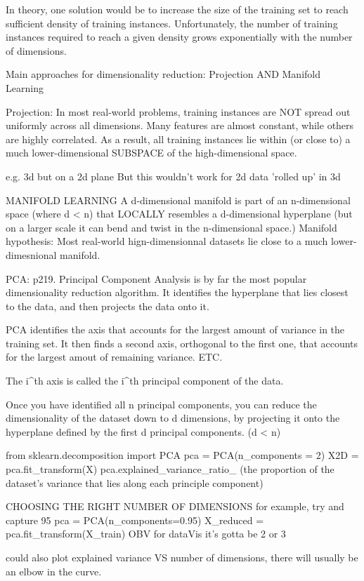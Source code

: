 In theory,
one solution would be to increase the size of the training set to reach sufficient density of training instances.
Unfortunately,
the number of training instances required to reach a given density grows exponentially with the number of dimensions.

Main approaches for dimensionality reduction:
Projection AND Manifold Learning

Projection:
In most real-world problems,
training instances are NOT spread out uniformly across all dimensions.
Many features are almost constant,
while others are highly correlated.
As a result, all training instances lie within (or close to)
a much lower-dimensional SUBSPACE of the high-dimensional space.

e.g. 3d but on a 2d plane
But this wouldn't work for 2d data 'rolled up' in 3d

MANIFOLD LEARNING
A d-dimensional manifold is part of an n-dimensional space (where d < n)
that LOCALLY resembles a d-dimensional hyperplane
(but on a larger scale it can bend and twist in the n-dimensional space.)
Manifold hypothesis:
Most real-world hign-dimensionnal datasets lie close to a much lower-dimesnional manifold.

PCA: p219.
Principal Component Analysis is by far the most popular dimensionality reduction algorithm.
It identifies the hyperplane that lies closest to the data,
and then projects the data onto it.

PCA identifies the axis that accounts for the largest amount of variance in the training set.
It then finds a second axis, orthogonal to the first one,
that accounts for the largest amout of remaining variance. ETC.

The i^th axis is called the i^th principal component of the data.

Once you have identified all n principal components,
you can reduce the dimensionality of the dataset down to d dimensions,
by projecting it onto the hyperplane defined by the first d principal components. (d < n)

from sklearn.decomposition import PCA
pca = PCA(n_components = 2)
X2D = pca.fit_transform(X)
pca.explained_variance_ratio_ (the proportion of the dataset's variance that lies along each principle component)

CHOOSING THE RIGHT NUMBER OF DIMENSIONS
for example, try and capture 95%
pca = PCA(n_components=0.95)
X_reduced = pca.fit_transform(X_train)
OBV for dataVis it's gotta be 2 or 3

could also plot explained variance VS number of dimensions,
there will usually be an elbow in the curve.

